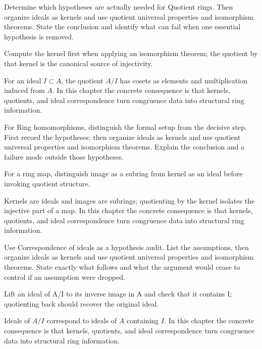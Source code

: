\begin{exercise}\label{exr:v01-05}
Determine which hypotheses are actually needed for Quotient rings. Then organize ideals as kernels and use quotient universal properties and isomorphism theorems. State the conclusion and identify what can fail when one essential hypothesis is removed.
\end{exercise}
\begin{hint}
Compute the kernel first when applying an isomorphism theorem; the quotient by that kernel is the canonical source of injectivity.
\end{hint}
\begin{solution}
For an ideal $I\subset A$, the quotient $A/I$ has cosets as elements and multiplication induced from $A$. In this chapter the concrete consequence is that kernels, quotients, and ideal correspondence turn congruence data into structural ring information.
\end{solution}

\begin{exercise}\label{exr:v01-06}
For Ring homomorphisms, distinguish the formal setup from the decisive step. First record the hypotheses; then organize ideals as kernels and use quotient universal properties and isomorphism theorems. Explain the conclusion and a failure mode outside those hypotheses.
\end{exercise}
\begin{hint}
For a ring map, distinguish image as a subring from kernel as an ideal before invoking quotient structure.
\end{hint}
\begin{solution}
Kernels are ideals and images are subrings; quotienting by the kernel isolates the injective part of a map. In this chapter the concrete consequence is that kernels, quotients, and ideal correspondence turn congruence data into structural ring information.
\end{solution}

\begin{exercise}\label{exr:v01-07}
Use Correspondence of ideals as a hypothesis audit. List the assumptions, then organize ideals as kernels and use quotient universal properties and isomorphism theorems. State exactly what follows and what the argument would cease to control if an assumption were dropped.
\end{exercise}
\begin{hint}
Lift an ideal of A/I to its inverse image in A and check that it contains I; quotienting back should recover the original ideal.
\end{hint}
\begin{solution}
Ideals of $A/I$ correspond to ideals of $A$ containing $I$. In this chapter the concrete consequence is that kernels, quotients, and ideal correspondence turn congruence data into structural ring information.
\end{solution}

